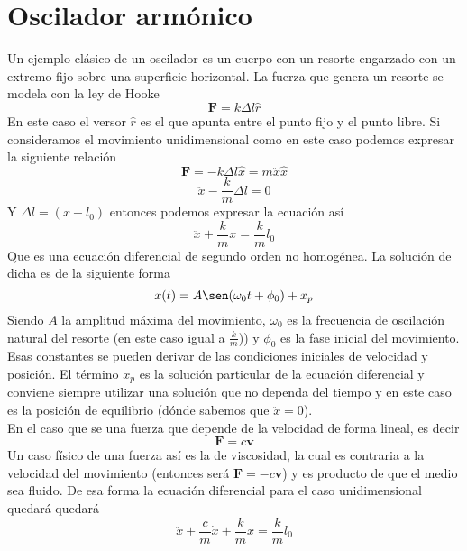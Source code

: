 \documentclass[a4paper]{article}
\numberwithin{equation}{section}
\begin{document}
\section{Oscilador armónico}
	Un ejemplo clásico de un oscilador es un cuerpo con un resorte engarzado con un extremo fijo sobre una superficie horizontal. La fuerza que genera un resorte se modela con la ley de Hooke
	\begin{equation}
		\boldsymbol{F} = k \Delta l \hat{r}
	\end{equation}
	En este caso el versor $\hat{r}$ es el que apunta entre el punto fijo y el punto libre. Si consideramos el movimiento unidimensional como en este caso podemos expresar la siguiente relación
	\begin{equation}
		\boldsymbol{F} = - k \Delta l \hat{x} = m \ddot{x} \hat{x}
	\end{equation}
	\begin{equation}
		\ddot{x} - \frac{k}{m} \Delta l = 0
	\end{equation}
	Y $\Delta l = (x - l_0)$ entonces podemos expresar la ecuación así
	\begin{equation}
		\ddot{x} + \frac{k}{m} x = \frac{k}{m} l_0
	\end{equation}
	Que es una ecuación diferencial de segundo orden no homogénea. La solución de dicha es de la siguiente forma
	\begin{equation}
		x(t) = A \sen(\omega_0 t + \phi_0) + x_p
	\end{equation}
	Siendo $A$ la amplitud máxima del movimiento, $\omega_0$ es la frecuencia de oscilación natural del resorte (en este caso igual a $\frac{k}{m}$)) y $\phi_0$ es la fase inicial del movimiento. Esas constantes se pueden derivar de las condiciones iniciales de velocidad y posición. El término $x_p$ es la solución particular de la ecuación diferencial y conviene siempre utilizar una solución que no dependa del tiempo y en este caso es la posición de equilibrio (dónde sabemos que $\ddot{x} = 0$).\\
	En el caso que se una fuerza que depende de la velocidad de forma lineal, es decir
	\begin{equation}
		\boldsymbol{F} = c \boldsymbol{v}
	\end{equation}
	Un caso físico de una fuerza así es la de viscosidad, la cual es contraria a la velocidad del movimiento (entonces será $\boldsymbol{F} = - c \boldsymbol{v}$) y es producto de que el medio sea fluido. De esa forma la ecuación diferencial para el caso unidimensional quedará quedará
	\begin{equation}
			\ddot{x} + \frac{c}{m} \dot{x} + \frac{k}{m} x = \frac{k}{m} l_0
	\end{equation}
\end{document}
